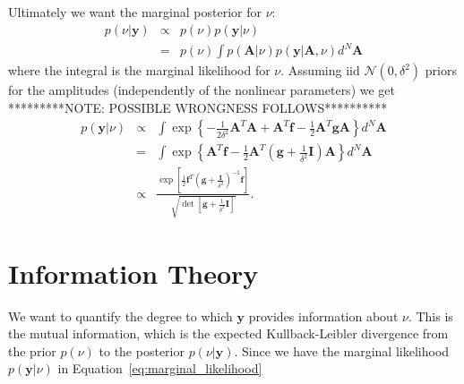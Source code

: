 \documentclass[a4paper, 10pt]{article}
\begin{document}
Ultimately we want the marginal posterior for $\nu$:
\begin{eqnarray}
p(\nu | \mathbf{y}) &\propto& p(\nu)p(\mathbf{y} | \nu)\\
&=& p(\nu)\int p(\mathbf{A}|\nu)p(\mathbf{y} | \mathbf{A}, \nu) d^N\mathbf{A}
\end{eqnarray}
where the integral is the marginal likelihood for $\nu$. Assuming
iid $\mathcal{N}(0, \delta^2)$ priors for the amplitudes (independently of
the nonlinear parameters) we get
*********NOTE: POSSIBLE WRONGNESS FOLLOWS**********
\begin{eqnarray}
p(\mathbf{y} | \nu)
&\propto& \int\exp\left\{
 -\frac{1}{2\delta^2} \mathbf{A}^T\mathbf{A}
 +\mathbf{A}^T\mathbf{f}
 -\frac{1}{2} \mathbf{A}^T\mathbf{g}\mathbf{A}
\right\} d^N\mathbf{A}\nonumber\\
&=&
\int\exp\left\{
\mathbf{A}^T\mathbf{f}
 -\frac{1}{2} \mathbf{A}^T\left(\mathbf{g} + \frac{1}{\delta^2}\mathbf{I}\right)\mathbf{A}
\right\} d^N\mathbf{A}\nonumber\\
&\propto&
\frac{\exp\left[\frac{1}{2}\mathbf{f}^T\left(\mathbf{g} + \frac{\mathbf{I}}{\delta^2}\right)^{-1}\mathbf{f}\right]}
{\sqrt{\det\left[\mathbf{g} + \frac{1}{\delta^2}\mathbf{I}\right]}}.\label{eq:marginal_likelihood}
\end{eqnarray}

\section{Information Theory}
We want to quantify the degree to which $\mathbf{y}$ provides information about
$\nu$. This is the mutual information, which is the expected Kullback-Leibler
divergence from the prior $p(\nu)$ to the posterior $p(\nu | \mathbf{y})$.
Since we have the marginal likelihood $p(\mathbf{y} | \nu)$ in
Equation~\ref{eq:marginal_likelihood}
\end{document}
